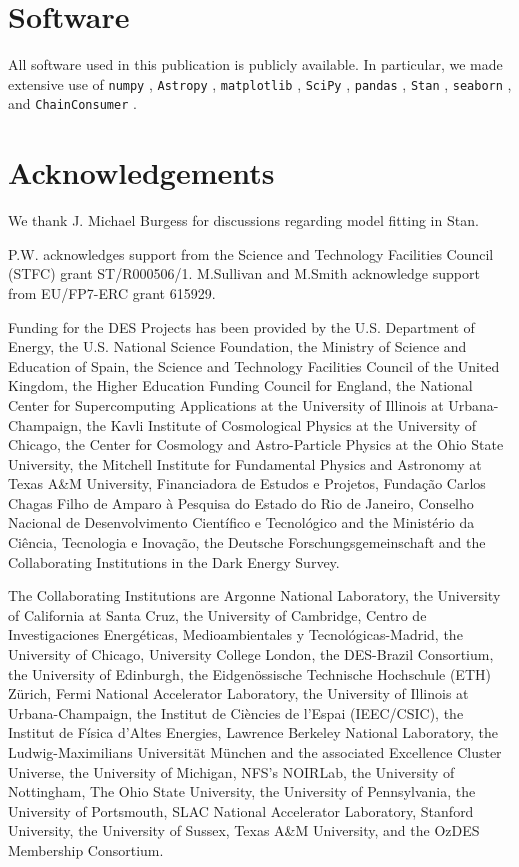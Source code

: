 \documentclass[fleqn,usenatbib]{mnras}
\begin{document}
\section*{Software}

All software used in this publication is publicly available. In particular, we made extensive use of \texttt{numpy} \citep{Harris2020}, \texttt{Astropy} \citep{AstropyCollaboration2013,AstropyCollaboration2018}, \texttt{matplotlib} \citep{Hunter2007}, \texttt{SciPy} \citep{Virtanen2020}, \texttt{pandas} \citep{Mckinney2010}, \texttt{Stan} \citep{Carpenter2017}, \texttt{seaborn} \citep{Waskom2020}, and \texttt{ChainConsumer} \citep{Hinton2016}.

\section*{Acknowledgements}
We thank J. Michael Burgess for discussions regarding model fitting in Stan.

 P.W. acknowledges support from the Science and Technology Facilities Council (STFC) grant ST/R000506/1. M.Sullivan and M.Smith acknowledge support from EU/FP7-ERC grant 615929. 
  
Funding for the DES Projects has been provided by the U.S. Department of Energy, the U.S. National Science Foundation, the Ministry of Science and Education of Spain, 
the Science and Technology Facilities Council of the United Kingdom, the Higher Education Funding Council for England, the National Center for Supercomputing 
Applications at the University of Illinois at Urbana-Champaign, the Kavli Institute of Cosmological Physics at the University of Chicago, 
the Center for Cosmology and Astro-Particle Physics at the Ohio State University,
the Mitchell Institute for Fundamental Physics and Astronomy at Texas A\&M University, Financiadora de Estudos e Projetos, 
Funda{\c c}{\~a}o Carlos Chagas Filho de Amparo {\`a} Pesquisa do Estado do Rio de Janeiro, Conselho Nacional de Desenvolvimento Cient{\'i}fico e Tecnol{\'o}gico and 
the Minist{\'e}rio da Ci{\^e}ncia, Tecnologia e Inova{\c c}{\~a}o, the Deutsche Forschungsgemeinschaft and the Collaborating Institutions in the Dark Energy Survey. 

The Collaborating Institutions are Argonne National Laboratory, the University of California at Santa Cruz, the University of Cambridge, Centro de Investigaciones Energ{\'e}ticas, 
Medioambientales y Tecnol{\'o}gicas-Madrid, the University of Chicago, University College London, the DES-Brazil Consortium, the University of Edinburgh, 
the Eidgen{\"o}ssische Technische Hochschule (ETH) Z{\"u}rich, 
Fermi National Accelerator Laboratory, the University of Illinois at Urbana-Champaign, the Institut de Ci{\`e}ncies de l'Espai (IEEC/CSIC), 
the Institut de F{\'i}sica d'Altes Energies, Lawrence Berkeley National Laboratory, the Ludwig-Maximilians Universit{\"a}t M{\"u}nchen and the associated Excellence Cluster Universe, 
the University of Michigan, NFS's NOIRLab, the University of Nottingham, The Ohio State University, the University of Pennsylvania, the University of Portsmouth, 
SLAC National Accelerator Laboratory, Stanford University, the University of Sussex, Texas A\&M University, and the OzDES Membership Consortium.
\end{document}
